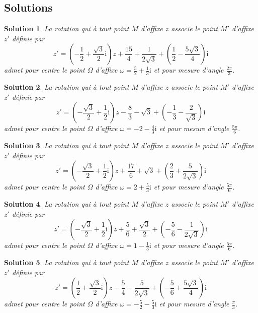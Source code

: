 \documentclass[a4paper]{article}
\newtheorem{solution}{Solution}
\begin{document}
\subsection*{Solutions}
\begin{solution}
La rotation qui \`a tout point $M$ d'affixe $z$ associe le point $M'$ d'affixe $z'$ d\'efinie par $$z'=\left(-\frac{1}{2}+\frac{\sqrt{3}}{2}\mathrm{i}\right)z+\frac{15}{4}+\frac{1}{2 \sqrt{3}}+\left(\frac{1}{2}-\frac{5 \sqrt{3}}{4}\right)\mathrm{i}$$ admet pour centre le point $\Omega$ d'affixe $\displaystyle \omega=\frac{5}{2}+\frac{1}{3}\mathrm{i}$ et pour mesure d'angle $\displaystyle \frac{2 \pi }{3}$.
\end{solution}\begin{solution}
La rotation qui \`a tout point $M$ d'affixe $z$ associe le point $M'$ d'affixe $z'$ d\'efinie par $$z'=\left(-\frac{\sqrt{3}}{2}+\frac{1}{2}\mathrm{i}\right)z-\frac{8}{3}-\sqrt{3}+\left(-\frac{1}{3}-\frac{2}{\sqrt{3}}\right)\mathrm{i}$$ admet pour centre le point $\Omega$ d'affixe $\displaystyle \omega=-2-\frac{4}{3}\mathrm{i}$ et pour mesure d'angle $\displaystyle \frac{5 \pi }{6}$.
\end{solution}\begin{solution}
La rotation qui \`a tout point $M$ d'affixe $z$ associe le point $M'$ d'affixe $z'$ d\'efinie par $$z'=\left(-\frac{\sqrt{3}}{2}+\frac{1}{2}\mathrm{i}\right)z+\frac{17}{6}+\sqrt{3}+\left(\frac{2}{3}+\frac{5}{2 \sqrt{3}}\right)\mathrm{i}$$ admet pour centre le point $\Omega$ d'affixe $\displaystyle \omega=2+\frac{5}{3}\mathrm{i}$ et pour mesure d'angle $\displaystyle \frac{5 \pi }{6}$.
\end{solution}\begin{solution}
La rotation qui \`a tout point $M$ d'affixe $z$ associe le point $M'$ d'affixe $z'$ d\'efinie par $$z'=\left(-\frac{\sqrt{3}}{2}+\frac{1}{2}\mathrm{i}\right)z+\frac{5}{6}+\frac{\sqrt{3}}{2}+\left(-\frac{5}{6}-\frac{1}{2 \sqrt{3}}\right)\mathrm{i}$$ admet pour centre le point $\Omega$ d'affixe $\displaystyle \omega=1-\frac{1}{3}\mathrm{i}$ et pour mesure d'angle $\displaystyle \frac{5 \pi }{6}$.
\end{solution}\begin{solution}
La rotation qui \`a tout point $M$ d'affixe $z$ associe le point $M'$ d'affixe $z'$ d\'efinie par $$z'=\left(\frac{1}{2}+\frac{\sqrt{3}}{2}\mathrm{i}\right)z-\frac{5}{4}-\frac{5}{2 \sqrt{3}}+\left(-\frac{5}{6}+\frac{5 \sqrt{3}}{4}\right)\mathrm{i}$$ admet pour centre le point $\Omega$ d'affixe $\displaystyle \omega=-\frac{5}{2}-\frac{5}{3}\mathrm{i}$ et pour mesure d'angle $\displaystyle \frac{\pi }{3}$.
\end{solution}
\end{document}
